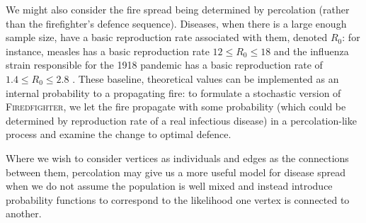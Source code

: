 \documentclass[../report.tex]{subfiles}
\begin{document}
We might also consider the fire spread being determined by percolation (rather than the firefighter's defence sequence). Diseases, when there is a large enough sample size, have a basic reproduction rate associated with them, denoted $R_0$: for instance, measles has a basic reproduction rate $12\leq R_0 \leq 18$ \cite{guerra_2017} and the influenza strain responsible for the 1918 pandemic has a basic reproduction rate of $1.4 \leq R_0 \leq 2.8$ \cite{ferguson_2006}. These baseline, theoretical values can be implemented as an internal probability to a propagating fire: to formulate a stochastic version of {\scshape Firedfighter}, we let the fire propagate with some probability (which could be determined by reproduction rate of a real infectious disease) in a percolation-like process and examine the change to optimal defence.

Where we wish to consider vertices as individuals and edges as the connections between them, percolation may give us a more useful model for disease spread when we do not assume the population is well mixed and instead introduce probability functions to correspond to the likelihood one vertex is connected to another.
\end{document}
